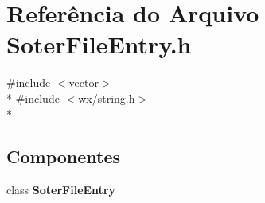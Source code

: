 \section{Referência do Arquivo Soter\+File\+Entry.\+h}
\label{_soter_file_entry_8h}
{\ttfamily \#include $<$vector$>$}\\*
{\ttfamily \#include $<$wx/string.\+h$>$}\\*
\subsection*{Componentes}
\begin{DoxyCompactItemize}
\item 
class {\bf Soter\+File\+Entry}
\end{DoxyCompactItemize}
